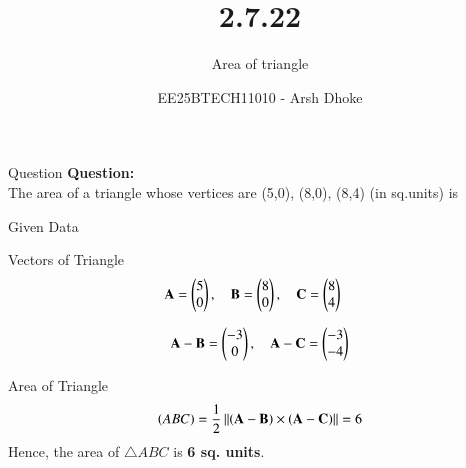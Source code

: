 \documentclass{beamer}
\title{2.7.22}
\subtitle{Area of triangle}
\author{EE25BTECH11010 - Arsh Dhoke}
\date{}
\begin{document}
\begin{frame}
  \titlepage
\end{frame}


\begin{frame}{Question}
\textbf{Question:}\\
The area of a triangle whose vertices are (5,0), (8,0), (8,4) (in sq.units) is
\end{frame}


\begin{frame}{Given Data}

\end{frame}


\begin{frame}{Vectors of Triangle}
\begin{align}
\mathbf{A} &= \begin{pmatrix}5\\0\end{pmatrix}, \quad 
\mathbf{B} = \begin{pmatrix}8\\0\end{pmatrix}, \quad 
\mathbf{C} = \begin{pmatrix}8\\4\end{pmatrix}
\end{align}

\begin{align}
\mathbf{A}-\mathbf{B}=\begin{pmatrix}-3\\0\end{pmatrix},\quad 
\mathbf{A}-\mathbf{C}=\begin{pmatrix}-3\\-4\end{pmatrix}
\end{align}
\end{frame}


\begin{frame}{Area of Triangle}
\begin{align}
\left(ABC\right)=\frac{1}{2}\left\lVert\left(\mathbf{A}-\mathbf{B}\right)\times\left(\mathbf{A}-\mathbf{C}\right)\right\rVert=6
\end{align}
Hence, the area of $\triangle ABC$ is \textbf{6 sq. units}.
\end{frame}
\end{document}

